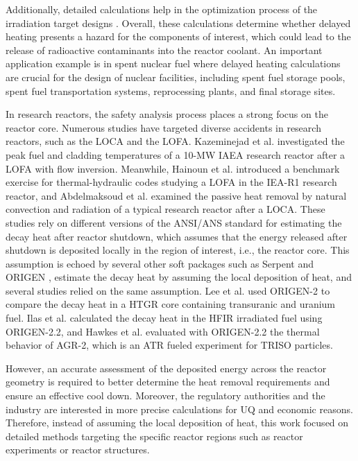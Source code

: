 \documentclass{style/nseJournal}
\begin{document}
Additionally, detailed calculations help in the optimization process of the irradiation target designs \cite{peterson-droogh_current_2018}.
Overall, these calculations determine whether delayed heating presents a hazard for the components of interest, which could lead to the release of radioactive contaminants into the reactor coolant.
An important application example is in spent nuclear fuel where delayed heating calculations are crucial for the design of nuclear facilities, including spent fuel storage pools, spent fuel transportation systems, reprocessing plants, and final storage sites.

In research reactors, the safety analysis process places a strong focus on the reactor core.
Numerous studies have targeted diverse accidents in research reactors, such as the \gls*{LOCA} and the \gls*{LOFA}.
Kazeminejad et al. \cite{kazeminejad_thermal_2008} investigated the peak fuel and cladding temperatures of a 10-MW IAEA research reactor after a LOFA with flow inversion.
Meanwhile, Hainoun et al. \cite{hainoun_international_2014} introduced a benchmark exercise for thermal-hydraulic codes studying a LOFA in the IEA-R1 research reactor, and Abdelmaksoud et al. \cite{abdelmaksoud_analysis_2022} examined the passive heat removal by natural convection and radiation of a typical research reactor after a LOCA.
These studies rely on different versions of the ANSI/ANS standard \cite{ans_decay_1994} for estimating the decay heat after reactor shutdown, which assumes that the energy released after shutdown is deposited locally in the region of interest, i.e., the reactor core.
This assumption is echoed by several other soft packages such as Serpent \cite{leppanen_serpent_2015, giot_decay_2018} and ORIGEN \cite{scale}, estimate the decay heat by assuming the local deposition of heat, and several studies relied on the same assumption.
Lee et al. \cite{lee_decay_2010} used ORIGEN-2 to compare the decay heat in a \gls*{HTGR} core containing transuranic and uranium fuel.
Ilas et al. \cite{ilas_modeling_2015} calculated the decay heat in the \gls*{HFIR} irradiated fuel using ORIGEN-2.2, and Hawkes et al. \cite{hawkes_sensitivity_2015} evaluated with ORIGEN-2.2 the thermal behavior of AGR-2, which is an \gls*{ATR} fueled experiment for TRISO particles.

However, an accurate assessment of the deposited energy across the reactor geometry is required to better determine the heat removal requirements and ensure an effective cool down.
Moreover, the regulatory authorities and the industry are interested in more precise calculations for \gls*{UQ} and economic reasons.
Therefore, instead of assuming the local deposition of heat, this work focused on detailed methods targeting the specific reactor regions such as reactor experiments or reactor structures.
\end{document}
